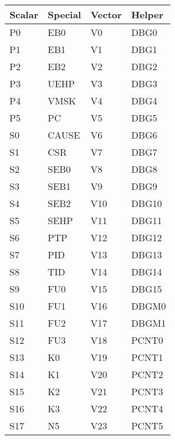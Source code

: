 \begin{table}[hbt!] %

    \begin{center}

    \begin{tabular}{|l|l|l|l|}

        \hline
        Scalar & Special & Vector & Helper \\
        \hline
        \addlinespace[10pt]
        \hline
        P0 & EB0 & V0 & DBG0 \\
        \hline
        P1 & EB1 & V1 & DBG1 \\
        \hline
        P2 & EB2 & V2 & DBG2 \\
        \hline
        P3 & UEHP & V3 & DBG3 \\
        \hline
        P4 & VMSK & V4 & DBG4 \\
        \hline
        P5 & PC & V5 & DBG5 \\
        \hline
        S0 & CAUSE & V6 & DBG6 \\
        \hline
        S1 & CSR & V7 & DBG7 \\
        \hline
        S2 & SEB0 & V8 & DBG8 \\
        \hline
        S3 & SEB1 & V9 & DBG9 \\
        \hline
        S4 & SEB2 & V10 & DBG10 \\
        \hline
        S5 & SEHP & V11 & DBG11 \\
        \hline
        S6 & PTP & V12 & DBG12 \\
        \hline
        S7 & PID & V13 & DBG13 \\
        \hline
        S8 & TID & V14 & DBG14 \\
        \hline
        S9 & FU0 & V15 & DBG15 \\
        \hline
        S10 & FU1 & V16 & DBGM0 \\
        \hline
        S11 & FU2 & V17 & DBGM1 \\
        \hline
        S12 & FU3 & V18 & PCNT0 \\
        \hline
        S13 & K0 & V19 & PCNT1 \\
        \hline
        S14 & K1 & V20 & PCNT2 \\
        \hline
        S15 & K2 & V21 & PCNT3 \\
        \hline
        S16 & K3 & V22 & PCNT4 \\
        \hline
        S17 & N5 & V23 & PCNT5 \\
        \hline

\end{tabular}
\end{center}
\end{table}
